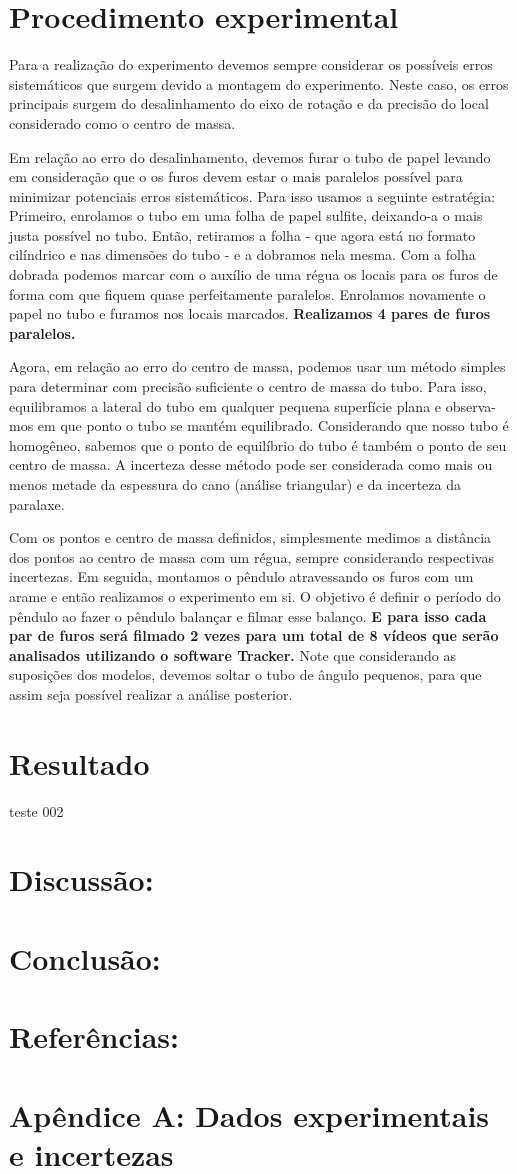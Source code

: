 \documentclass[a4paper]{report}
\begin{document}
\section*{Procedimento experimental}

\qquad Para a realização do experimento devemos sempre considerar os possíveis erros sistemáticos que surgem devido a montagem do experimento. Neste caso, os erros principais surgem do desalinhamento do eixo de rotação e da precisão do local considerado como o centro de massa.

\qquad Em relação ao erro do desalinhamento, devemos furar o tubo de papel levando em consideração que o os furos devem estar o mais paralelos possível para minimizar potenciais erros sistemáticos. Para isso usamos a seguinte estratégia: Primeiro, enrolamos o tubo em uma folha de papel sulfite, deixando-a o mais justa possível no tubo. Então, retiramos a folha - que agora está no formato cilíndrico e nas dimensões do tubo - e a dobramos nela mesma. Com a folha dobrada podemos marcar com o auxílio de uma régua os locais para os furos de forma com que fiquem quase perfeitamente paralelos. Enrolamos novamente o papel no tubo e furamos nos locais marcados.\textbf{ Realizamos 4 pares de furos paralelos.}

\qquad Agora, em relação ao erro do centro de massa, podemos usar um método simples para determinar com precisão suficiente o centro de massa do tubo. Para isso, equilibramos a lateral do tubo em qualquer pequena superfície plana e observa-mos em que ponto o tubo se mantém equilibrado. Considerando que nosso tubo é homogêneo, sabemos que o ponto de equilíbrio do tubo é também o ponto de seu centro de massa. A incerteza desse método pode ser considerada como mais ou menos metade da espessura do cano (análise triangular) e da incerteza da paralaxe.

\qquad Com os pontos e centro de massa definidos, simplesmente medimos a distância dos pontos ao centro de massa com um régua, sempre considerando respectivas incertezas. Em seguida, montamos o pêndulo atravessando os furos com um arame e então realizamos o experimento em si. O objetivo é definir o período do pêndulo ao fazer o pêndulo balançar e filmar esse balanço.\textbf{ E para isso cada par de furos será filmado 2 vezes para um total de 8 vídeos que serão analisados utilizando o software Tracker.} Note que considerando as suposições dos modelos, devemos soltar o tubo de ângulo pequenos, para que assim seja possível realizar a análise posterior.
\section*{Resultado}
\qquad teste 002
\section*{Discussão:}
\section*{Conclusão:}
\section*{Referências:}
\section*{Apêndice A: Dados experimentais e incertezas}
\end{document}
